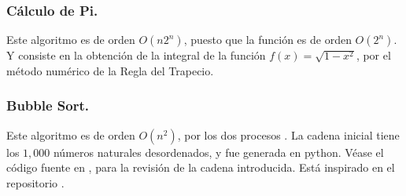 \documentclass[11pt,a4paper]{article}
\begin{document}
\subsubsection{Cálculo de Pi.} %
\label{subs:calc_pi}
Este algoritmo es de orden \(O(n 2^n)\), puesto que la función  es de orden \(O(2^n)\).
Y consiste en la obtención de la integral de la función \(f(x) = \sqrt{1-x^2}\), por el método numérico de la Regla del Trapecio.

\subsubsection{Bubble Sort.} %
\label{subs:bubble_sort}
Este algoritmo es de orden \(O(n^2)\), por los dos procesos .
La cadena inicial  tiene los \(1,000\) números naturales desordenados, y fue generada en python.
Véase el código fuente en , para la revisión de la cadena introducida.
Está inspirado en el repositorio .

\end{document}
